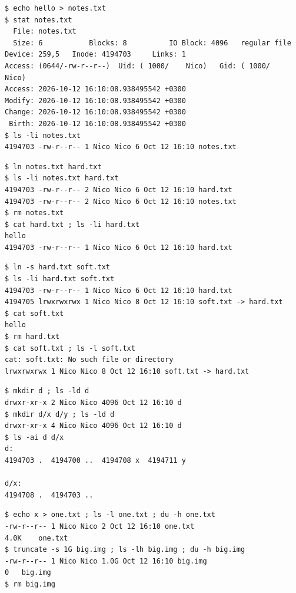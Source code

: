 \documentclass[11pt,a4paper]{article}
\begin{document}
\begin{lstlisting}[caption={An inode, and a name that is not part of it}]
$ echo hello > notes.txt
$ stat notes.txt
  File: notes.txt
  Size: 6         	Blocks: 8          IO Block: 4096   regular file
Device: 259,5	Inode: 4194703     Links: 1
Access: (0644/-rw-r--r--)  Uid: ( 1000/    Nico)   Gid: ( 1000/    Nico)
Access: 2026-10-12 16:10:08.938495542 +0300
Modify: 2026-10-12 16:10:08.938495542 +0300
Change: 2026-10-12 16:10:08.938495542 +0300
 Birth: 2026-10-12 16:10:08.938495542 +0300
$ ls -li notes.txt
4194703 -rw-r--r-- 1 Nico Nico 6 Oct 12 16:10 notes.txt
\end{lstlisting}

\begin{lstlisting}[caption={Hard link, then removing the original}]
$ ln notes.txt hard.txt
$ ls -li notes.txt hard.txt
4194703 -rw-r--r-- 2 Nico Nico 6 Oct 12 16:10 hard.txt
4194703 -rw-r--r-- 2 Nico Nico 6 Oct 12 16:10 notes.txt
$ rm notes.txt
$ cat hard.txt ; ls -li hard.txt
hello
4194703 -rw-r--r-- 1 Nico Nico 6 Oct 12 16:10 hard.txt
\end{lstlisting}

\begin{lstlisting}[caption={Symbolic link, then removing its target}]
$ ln -s hard.txt soft.txt
$ ls -li hard.txt soft.txt
4194703 -rw-r--r-- 1 Nico Nico 6 Oct 12 16:10 hard.txt
4194705 lrwxrwxrwx 1 Nico Nico 8 Oct 12 16:10 soft.txt -> hard.txt
$ cat soft.txt
hello
$ rm hard.txt
$ cat soft.txt ; ls -l soft.txt
cat: soft.txt: No such file or directory
lrwxrwxrwx 1 Nico Nico 8 Oct 12 16:10 soft.txt -> hard.txt
\end{lstlisting}

\begin{lstlisting}[caption={Link counts of a directory}]
$ mkdir d ; ls -ld d
drwxr-xr-x 2 Nico Nico 4096 Oct 12 16:10 d
$ mkdir d/x d/y ; ls -ld d
drwxr-xr-x 4 Nico Nico 4096 Oct 12 16:10 d
$ ls -ai d d/x
d:
4194703 .  4194700 ..  4194708 x  4194711 y

d/x:
4194708 .  4194703 ..
\end{lstlisting}

\begin{lstlisting}[caption={Size is not space}]
$ echo x > one.txt ; ls -l one.txt ; du -h one.txt
-rw-r--r-- 1 Nico Nico 2 Oct 12 16:10 one.txt
4.0K	one.txt
$ truncate -s 1G big.img ; ls -lh big.img ; du -h big.img
-rw-r--r-- 1 Nico Nico 1.0G Oct 12 16:10 big.img
0	big.img
$ rm big.img
\end{lstlisting}
\end{document}
